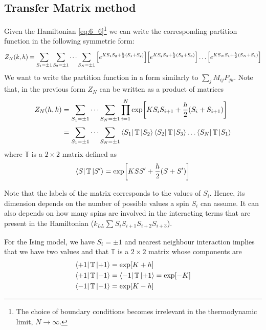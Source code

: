 \documentclass[../main/main.tex]{subfiles}
\begin{document}
\subsection{Transfer Matrix method}

Given the Hamiltonian \eqref{eq:6_6}\footnote{The choice of boundary conditions becomes irrelevant in the thermodynamic limit, \( N \rightarrow \infty  \).} we can write the corresponding partition function in the following symmetric form:
\begin{equation*}
  Z_N (k,h) = \sum_{S_1 = \pm 1}^{} \sum_{S_2 = \pm 1}^{}  \dots \sum_{S_N = \pm 1}^{}
  \qty[e^{K S_1 S_2 + \frac{h}{2}(S_1+S_2)} ] \qty[e^{K S_2 S_3 + \frac{h}{2}(S_2+S_3)} ] \dots \qty[e^{K S_N S_1 + \frac{h}{2}(S_N+S_1)} ]
\end{equation*}
We want to write the partition function in a form similarly to \( \sum_{j}^{}  M_{ij} P_{jk} \).
Note that, in the previous form \( Z_N \) can be written as a product of matrices
\begin{equation}
\begin{split}
Z_N (h,k)  &= \sum_{S_1 = \pm 1}^{} \dots \sum_{S_N = \pm 1}^{} \prod_{i=1}^{N} \exp [K S_i S_{i+1} + \frac{h}{2} (S_i + S_{i+1})] \\
& =  \sum_{S_1 = \pm 1}^{} \dots \sum_{S_N = \pm 1}^{} \bra{S_1} \mathbb{T} \ket{S_2} \bra{S_2}  \mathbb{T} \ket{S_3} \dots \bra{S_N}  \mathbb{T} \ket{S_1}
\end{split}
\end{equation}
where \( \mathbb{T} \) is a \( 2 \times 2 \)  matrix defined as
\begin{equation}
  \bra{S} \mathbb{T} \ket{S'} = \exp [K S S' + \frac{h}{2} (S+S')]
\end{equation}
\begin{remark}
  Note that the labels of the matrix corresponds to the values of \( S_i \). Hence, its dimension depends on the number of possible values a spin \( S_i \) can assume.
  It can also depends on how many spins are involved in the interacting terms that are present in the Hamiltonian (\( k_{LL} \sum_{}^{} S_i S_{i+1} S_{i+2} S_{i+3}  \)).
\end{remark}
 For the Ising model, we have \( S_i = \pm 1 \) and nearest neighbour interaction implies that we have two values and that \( \mathbb{T} \) is a \( 2 \times 2 \) matrix whose components are
\begin{subequations}
\begin{align}
  \bra{+1} \mathbb{T} \ket{+1} &= \exp [K+h]  \\
    \bra{+1} \mathbb{T} \ket{-1} &=   \bra{-1} \mathbb{T} \ket{+1} = \exp [-K] \\
      \bra{-1} \mathbb{T} \ket{-1} &=\exp [K-h] 
\end{align}
\end{subequations}
\end{document}
